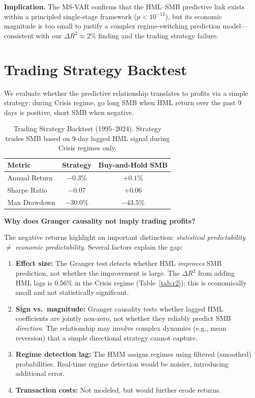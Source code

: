 \documentclass[sigconf,anonymous]{acmart}
\begin{document}
\textbf{Implication.} The MS-VAR confirms that the HML--SMB predictive link exists
within a principled single-stage framework ($p < 10^{-12}$), but its economic magnitude
is too small to justify a complex regime-switching prediction model---consistent with
our $\Delta R^2 \approx 2\%$ finding and the trading strategy failure.

\section{Trading Strategy Backtest}
\label{app:trading}

We evaluate whether the predictive relationship translates to profits via a simple
strategy: during Crisis regime, go long SMB when HML return over the past 9 days
is positive, short SMB when negative.

\begin{table}[t]
\centering
\caption{Trading Strategy Backtest (1995--2024). Strategy trades SMB based on
9-day lagged HML signal during Crisis regimes only.}
\label{tab:trading}
\begin{tabular}{lcc}
\toprule
Metric & Strategy & Buy-and-Hold SMB \\
\midrule
Annual Return & $-0.3\%$ & $+0.1\%$ \\
Sharpe Ratio & $-0.07$ & $+0.06$ \\
Max Drawdown & $-30.0\%$ & $-43.5\%$ \\
\bottomrule
\end{tabular}
\end{table}

\textbf{Why does Granger causality not imply trading profits?}

The negative returns highlight an important distinction: \emph{statistical predictability}
$\neq$ \emph{economic predictability}. Several factors explain the gap:

\begin{enumerate}
    \item \textbf{Effect size:} The Granger test detects whether HML \emph{improves}
    SMB prediction, not whether the improvement is large. The $\Delta R^2$ from
    adding HML lags is 0.56\% in the Crisis regime (Table~\ref{tab:r2}); this is
    economically small and not statistically significant.

    \item \textbf{Sign vs.\ magnitude:} Granger causality tests whether lagged HML
    coefficients are jointly non-zero, not whether they reliably predict SMB \emph{direction}.
    The relationship may involve complex dynamics (e.g., mean reversion) that a simple
    directional strategy cannot capture.

    \item \textbf{Regime detection lag:} The HMM assigns regimes using filtered
    (smoothed) probabilities. Real-time regime detection would be noisier, introducing
    additional error.

    \item \textbf{Transaction costs:} Not modeled, but would further erode returns.
\end{enumerate}
\end{document}
